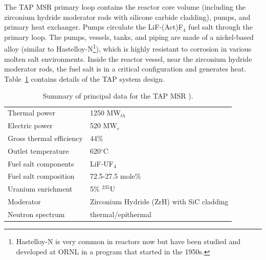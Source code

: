 \documentclass{anstrans}
\begin{document}
The \gls{TAP} \gls{MSR} primary loop contains the reactor core volume 
(including the zirconium hydride moderator rods with silicone carbide 
cladding), pumps, and primary heat exchanger. Pumps circulate the 
LiF-(Act)F$_4$ fuel salt through the primary loop. The pumps, vessels, tanks, 
and piping are made of a nickel-based alloy (similar to Hastelloy-N\footnote{ 
Hastelloy-N  is very common in reactors now but have been studied and 
developed at \gls{ORNL} in a program that started in the 1950s.}), which is 
highly resistant to corrosion in various molten salt environments. Inside the 
reactor vessel, near the zirconium hydride moderator rods, 
the fuel salt is in a critical configuration and generates heat. 
Table~\ref{tab:tap_tab} contains details of the \gls{TAP} system design. 
\begin{table}[h!]
	\caption{Summary of principal data for the \gls{TAP} \gls{MSR} 	
	\cite{transatomic_power_corporation_technical_2016, 
	transatomic_power_corporation_neutronics_2016}). }
	\begin{tabularx}{\linewidth}{X  X }
		\hline
		Thermal power		& 1250 MW$_{th}  $       
		\\ 
		Electric power		& 520 MW$_e  $ 			 
		\\ 
		Gross thermal efficiency 	& 44\%     				 
		\\  
		Outlet temperature			& 620$^{\circ}$C         
		\\ 
		Fuel salt components        & LiF-UF$_4$				 \\  
		Fuel salt composition       & 72.5-27.5 mole\%			 
		\\  
		Uranium enrichment          & 5\% $^{235}$U          	 \\
		Moderator & Zirconium Hydride (ZrH) with SiC 
		cladding \\
		Neutron spectrum						& 
		thermal/epithermal                 \\
		\hline
	\end{tabularx}
	\label{tab:tap_tab}
\end{table}
\end{document}
